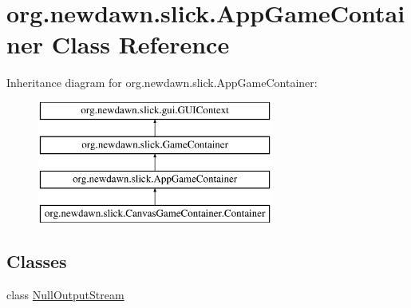 \hypertarget{classorg_1_1newdawn_1_1slick_1_1_app_game_container}{}\section{org.\+newdawn.\+slick.\+App\+Game\+Container Class Reference}
\label{classorg_1_1newdawn_1_1slick_1_1_app_game_container}
Inheritance diagram for org.\+newdawn.\+slick.\+App\+Game\+Container\+:\begin{figure}[H]
\begin{center}
\leavevmode
\includegraphics[height=4.000000cm]{classorg_1_1newdawn_1_1slick_1_1_app_game_container}
\end{center}
\end{figure}
\subsection*{Classes}
\begin{DoxyCompactItemize}
\item 
class \mbox{\hyperlink{classorg_1_1newdawn_1_1slick_1_1_app_game_container_1_1_null_output_stream}{Null\+Output\+Stream}}
\end{DoxyCompactItemize}
